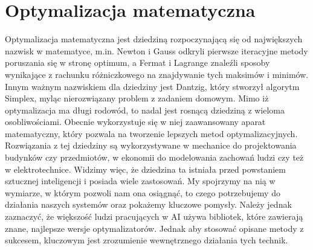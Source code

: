 \chapter{Optymalizacja matematyczna}
\label{chap:optimization}

Optymalizacja matematyczna jest dziedziną rozpoczynającą się od największych nazwisk w matematyce, m.in. Newton i Gauss odkryli pierwsze iteracyjne metody poruszania się w stronę optimum, a Fermat i Lagrange znaleźli sposoby wynikające z rachunku różniczkowego na znajdywanie tych maksimów i minimów. Innym ważnym nazwiskiem dla dziedziny jest Dantzig, który stworzył algorytm Simplex, myląc \break nierozwiązany problem z zadaniem domowym. Mimo iż optymalizacja ma długi rodowód, to nadal jest rosnącą dziedziną z wieloma osobliwościami. Obecnie wykorzystuje się w niej zaawansowany aparat matematyczny, który pozwala na tworzenie lepszych metod optymalizacyjnych. Rozwiązania z tej dziedziny są wykorzystywane w mechanice do projektowania budynków czy przedmiotów, w ekonomii do modelowania zachowań ludzi czy też w elektrotechnice. Widzimy więc, że dziedzina ta istniała przed powstaniem sztucznej inteligencji i posiada wiele zastosowań. My spojrzymy na nią w wymiarze, w którym pozwoli nam ona osiągnąć, to czego potrzebujemy do działania naszych systemów oraz pokażemy kluczowe pomysły. Należy jednak zaznaczyć, że większość ludzi pracujących w AI używa bibliotek, które zawierają znane, najlepsze wersje optymalizatorów. Jednak aby stosować opisane metody z sukcesem, kluczowym jest zrozumienie wewnętrznego działania tych technik.\newline

